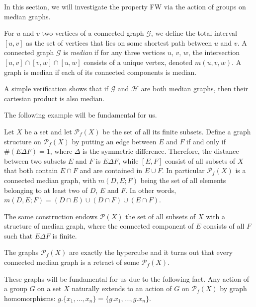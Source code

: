 In this section, we will investigate the property FW via the action of groups on median graphs.

For $u$ and $v$ two vertices of a connected graph $\mathcal G$, we define the total interval $[u,v]$ as the set of vertices that lies on some shortest path between $u$ and $v$.
A connected graph $\mathcal G$ is \emph{median} if for any three vertices $u$, $v$, $w$, the intersection $[u,v]\cap[v,w]\cap[u,w]$ consists of a unique vertex, denoted $m(u,v,w)$.
A graph is median if each of its connected components is median.

A simple verification shows that if $\mathcal G$ and $\mathcal H$ are both median graphs, then their cartesian product is also median.

The following example will be fundamental for us.
\begin{exmp}
Let $X$ be a set and let  $\mathcal P_f(X)$ be the set of all its finite subsets.
Define a graph structure on $\mathcal P_f(X)$ by putting an edge between $E$ and $F$ if and only if $\#(E\Delta F)=1$, where $\Delta$ is the symmetric difference.
Therefore, the distance between two subsets $E$ and $F$ is $E\Delta F$, while $[E,F]$ consist of all subsets of $X$ that both contain $E\cap F$ and are contained in $E\cup F$.
In particular $\mathcal P_f(X)$ is a connected median graph, with $m(D,E;F)$ being the set of all elements belonging to at least two of $D$, $E$ and $F$. In other words,
$m(D,E;F)=(D\cap E)\cup(D\cap F)\cup(E\cap F)$.

The same construction endows $\mathcal P(X)$ the set of all subsets of $X$ with a structure of median graph, where the connected component of $E$ consists of all $F$ such that $E\Delta F$ is finite.
\end{exmp}

The graphs $\mathcal P_f(X)$ are exactly the hypercube and it turns out \cite{} that every connected median graph is a retract of some $\mathcal P_f(X)$.

These graphs will be fundamental for us due to the following fact.
Any action of a group $G$ on a set $X$ naturally extends to an action of $G$ on $\mathcal P_f(X)$ by graph homomorphisms: $g.\{x_1,\dots,x_n\}=\{g.x_1,\dots,g.x_n\}$.


